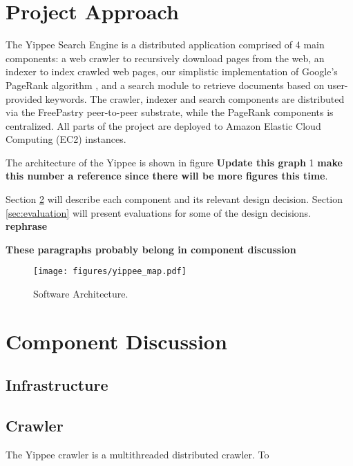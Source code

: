 \documentclass[11pt, letterpaper, oneside, twocolumn]{article}
\begin{document}
\section{Project Approach}
\label{sec:approach}

The Yippee Search Engine is a distributed application comprised of 4 main components: a web crawler to recursively download pages from the web, an indexer to index crawled web pages, our simplistic implementation of Google's PageRank algorithm \cite{pagerank}, and a search module to retrieve documents based on user-provided keywords.  The crawler, indexer and search components are distributed via the FreePastry peer-to-peer substrate, while the PageRank components is centralized.  All parts of the project are deployed to Amazon Elastic Cloud Computing (EC2) instances.  

The architecture of the Yippee is shown in figure \textbf{Update this graph} 1 \textbf{make this number a reference since there will be more figures this time}.


Section \ref{sec:component} will describe each component and its relevant design decision. Section \ref{sec:evaluation} will present evaluations for some of the design decisions. \textbf{rephrase}

\textbf{These paragraphs probably belong in component discussion}




\label{sec:SOAR} %
\begin{figure}[!b]
  \centering
  \texttt{[image: figures/yippee\_map.pdf]}
  \caption{Software Architecture.}
\end{figure}



\section{Component Discussion}
\label{sec:component}



\subsection{Infrastructure}

\subsection{Crawler}

The Yippee crawler is a multithreaded distributed crawler. To 
\end{document}
